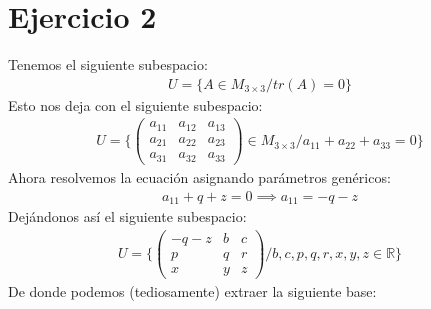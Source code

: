 \documentclass{article}
\begin{document}
\section{Ejercicio 2}
Tenemos el siguiente subespacio:
\begin{equation}
    \begin{split}
        U = \{ A \in M_{3\times 3} / tr(A)=0 \}
    \end{split}
\end{equation}
Esto nos deja con el siguiente subespacio:
\begin{equation}
    \begin{split}
        U = \{ \begin{pmatrix}
        a_{11} & a_{12} & a_{13} \\ a_{21} & a_{22} & a_{23} \\ a_{31} & a_{32} & a_{33}
        \end{pmatrix} \in M_{3\times 3} / a_{11} + a_{22} + a_{33} = 0 \}
    \end{split}
\end{equation}
Ahora resolvemos la ecuación asignando parámetros genéricos:
\begin{equation}
    \begin{split}
        a_{11} + q + z = 0 \implies a_{11} = -q - z
    \end{split}
\end{equation}
Dejándonos así el siguiente subespacio:
\begin{equation}
    \begin{split}
        U = \{ \begin{pmatrix}
        -q-z & b & c \\ p & q & r \\ x & y & z
        \end{pmatrix} / b,c,p,q,r,x,y,z \in \mathbb{R} \}
    \end{split}
\end{equation}
De donde podemos (tediosamente) extraer la siguiente base:
\end{document}

